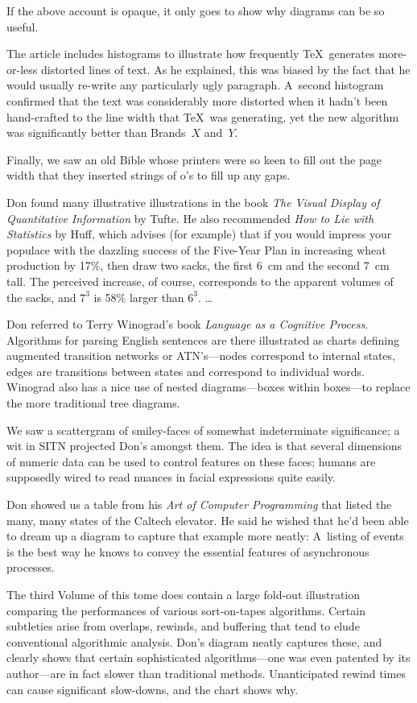 If the above account is opaque, it only goes to show why diagrams can be
so useful.

The article includes
 histograms to illustrate how frequently \TeX\ generates
more-or-less distorted lines of text. As he explained, this was biased
by the fact that he would usually re-write any particularly ugly
paragraph. A~second histogram confirmed that the text was considerably
more distorted when it hadn't been hand-crafted to the line width that
\TeX\ was generating, yet the new algorithm was significantly better
than Brands~$X$ and~$Y$.

Finally, we saw an old Bible whose printers were so keen to fill out
the page width that they inserted strings of o's to fill up any gaps.

Don found many illustrative illustrations in the book {\sl The Visual
Display of Quantitative Information\/} by Tufte. He also recommended
{\sl How to Lie with Statistics\/} by Huff, which advises (for example)
that if you would impress your populace with the dazzling success of
the Five-Year Plan in increasing wheat production by 17\%, then draw
two sacks, the first 6~cm and the second 7~cm tall. The perceived
increase, of course, corresponds to the apparent volumes of the sacks,
and $7^3$ is 58\% larger than $6^3$. \dots

Don referred to Terry Winograd's book {\sl Language as a Cognitive
Process}.  Algorithms for parsing English sentences are there
illustrated as charts defining augmented transition networks or 
ATN's---nodes correspond to internal states, edges are transitions between
states and correspond to individual words. Winograd also has a nice
use of nested diagrams---boxes within boxes---to replace the more
traditional tree diagrams.

We saw a scattergram of smiley-faces of somewhat indeterminate
significance; a wit in SITN projected Don's amongst them.
The idea is that several dimensions of numeric data can be used to
control features on these faces; humans are supposedly wired to
read nuances in facial expressions quite easily.

Don showed us a table from his {\sl Art of Computer Programming\/} that
listed the many, many states of the Caltech elevator. He said he
wished that he'd been able to dream up a diagram to capture that example
more neatly: A~listing of events is the best way he knows to convey
the essential features of asynchronous processes.

 The third Volume of this tome does contain a large fold-out
illustration comparing the performances of various sort-on-tapes
algorithms.  Certain subtleties arise from overlaps, rewinds, and
buffering that tend to elude conventional algorithmic analysis. Don's
diagram neatly captures these, and clearly shows that certain
sophisticated algorithms---one was even patented by its 
author---are
in fact slower than traditional methods. Unanticipated rewind
times can cause significant slow-downs, and the chart shows why.

